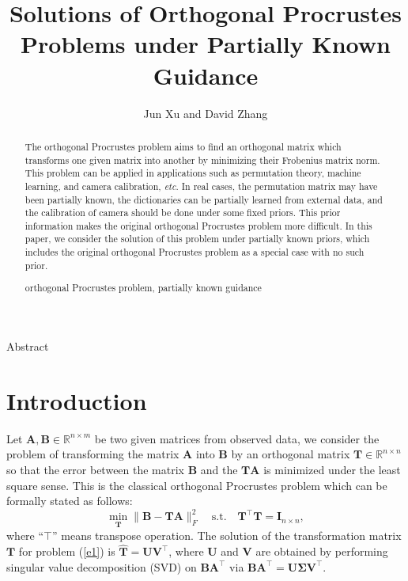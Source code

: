 \documentclass[titlepage,11pt,twoside]{article}
\begin{document}

\title{Solutions of Orthogonal Procrustes Problems under Partially Known Guidance}

\author{Jun Xu and David Zhang }






\begin{center}\vskip3pt


\vspace{32pt}

Abstract\vskip3pt

\end{center}


\begin{abstract}
The orthogonal Procrustes problem aims to find an orthogonal matrix which transforms one given matrix into another by minimizing their Frobenius matrix norm. This problem can be applied in applications such as permutation theory, machine learning, and camera calibration, \emph{etc}. In real cases, the permutation matrix may have been partially known, the dictionaries can be partially learned from external data, and the calibration of camera should be done under some fixed priors. This prior information makes the original orthogonal Procrustes problem more difficult. In this paper, we consider the solution of this problem under partially known priors, which includes the original orthogonal Procrustes problem as a special case with no such prior.
\begin{keywords}
orthogonal Procrustes problem, partially known guidance
\end{keywords}
\end{abstract}

\section{Introduction}
Let $\mathbf{A},\mathbf{B}\in\mathbb{R}^{n\times m}$ be two given matrices from observed data, we consider the problem of transforming the matrix $\mathbf{A}$ into $\mathbf{B}$ by an orthogonal matrix $\mathbf{T}\in\mathbb{R}^{n\times n}$ so that the error between the matrix $\mathbf{B}$ and the $\mathbf{T}\mathbf{A}$ is minimized under the least square sense. This is the classical orthogonal Procrustes problem \cite{procrustesprogram} which can be formally stated as follows:
\begin{equation}\label{e1}
\min_{\mathbf{T}}\|\mathbf{B}-\mathbf{T}\mathbf{A}\|_{F}^{2}
\quad
\text{s.t.}
\quad
\mathbf{T}^{\top}\mathbf{T} = \mathbf{I}_{n\times n},
\end{equation}
where ``$\top$'' means transpose operation. The solution of the transformation matrix $\mathbf{T}$ for problem (\ref{e1}) is
$\mathbf{\hat{T}}=\mathbf{U}\mathbf{V}^{\top}$, where $\mathbf{U}$ and $\mathbf{V}$ are obtained by performing singular value decomposition (SVD) on $\mathbf{B}\mathbf{A}^{\top}$ via $\mathbf{B}\mathbf{A}^{\top}=\mathbf{U}\mathbf{\Sigma}\mathbf{V}^{\top}$.
\end{document}
